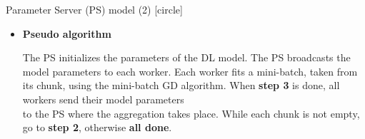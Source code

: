 \begin{frame}{Parameter Server (PS) model (2)}
    [circle]
    \begin{itemize}
        \item{\textbf{Pseudo algorithm}
        \begin{algorithm}[H]
            \vspace{0.5cm}
            \begin{algorithmic}[1]
                \STATE The PS initializes the parameters of the DL model.
                \STATE The PS broadcasts the model parameters to each worker.
                \STATE Each worker fits a mini-batch, taken from its chunk, using the mini-batch GD algorithm.
                \STATE When \textbf{step 3} is done, all workers send their model parameters\\to the PS where the aggregation takes place.
                \STATE While each chunk is not empty, go to \textbf{step 2}, otherwise \textbf{all done}.
            \end{algorithmic}
            \label{alg:param-server}
        \end{algorithm}
        }
    \end{itemize}
\end{frame}

